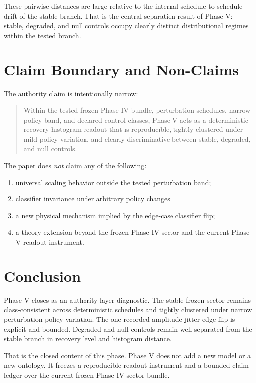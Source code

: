 \documentclass[11pt]{article}
\begin{document}
These pairwise distances are large relative to the internal schedule-to-schedule drift of the stable branch. That is the central separation result of Phase V: stable, degraded, and null controls occupy clearly distinct distributional regimes within the tested branch.

\section{Claim Boundary and Non-Claims}

The authority claim is intentionally narrow:

\begin{quote}
Within the tested frozen Phase IV bundle, perturbation schedules, narrow policy band, and declared control classes, Phase V acts as a deterministic recovery-histogram readout that is reproducible, tightly clustered under mild policy variation, and clearly discriminative between stable, degraded, and null controls.
\end{quote}

The paper does \emph{not} claim any of the following:

\begin{enumerate}
\item universal scaling behavior outside the tested perturbation band;
\item classifier invariance under arbitrary policy changes;
\item a new physical mechanism implied by the edge-case classifier flip;
\item a theory extension beyond the frozen Phase IV sector and the current Phase V readout instrument.
\end{enumerate}

\section{Conclusion}

Phase V closes as an authority-layer diagnostic. The stable frozen sector remains class-consistent across deterministic schedules and tightly clustered under narrow perturbation-policy variation. The one recorded amplitude-jitter edge flip is explicit and bounded. Degraded and null controls remain well separated from the stable branch in recovery level and histogram distance.

That is the closed content of this phase. Phase V does not add a new model or a new ontology. It freezes a reproducible readout instrument and a bounded claim ledger over the current frozen Phase IV sector bundle.
\end{document}
